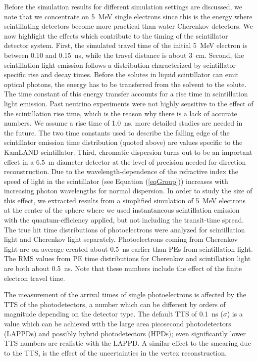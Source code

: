 \documentclass[aps,prc,twocolumn,groupedaddress,showpacs,amsmath,amssymb,floatfix,superscriptaddress]{revtex4}
\begin{document}
Before the simulation results for different simulation settings are
discussed, we note that  we concentrate on 5~MeV single electrons since this is the energy where scintillating detectors become more practical than water Cherenkov detectors. 
We now highlight the effects which
contribute to the timing of the scintillator detector system.  First,
the simulated travel time of the initial 5~MeV electron is between
0.10 and 0.15~ns, while the travel distance is about 3~cm. Second, the
scintillation light emission follows a distribution characterized by
scintillator-specific rise and decay times. Before the solutes in
liquid scintillator can emit optical photons, the energy has to be
transferred from the solvent to the solute. The time constant of this
energy transfer accounts for a rise time in scintillation light
emission. Past neutrino experiments were not highly sensitive to the
effect of the scintillation rise time, which is the reason why there
is a lack of accurate numbers. We assume a rise time of 1.0~ns, more
detailed studies are needed in the future. The two time constants used
to describe the falling edge of the scintillator emission time
distribution (quoted above) are values specific to the KamLAND
scintillator. Third, chromatic dispersion turns out to be an important
effect in a 6.5~m diameter detector at the level of precision needed
for direction reconstruction. Due to the wavelength-dependence of the
refractive index the speed of light in the scintillator (see Equation
(\ref{eqGroup})) increases with increasing photon wavelengths for
normal dispersion. In order to study the size of this effect, we
extracted results from a simplified simulation of 5~MeV electrons at
the center of the sphere where we used instantaneous scintillation
emission with the quantum-efficiency applied, but not including
the transit-time spread. The true hit time distributions of
photoelectrons were analyzed for scintillation light and Cherenkov
light separately. Photoelectrons coming from Cherenkov light are on
average created about 0.5~ns earlier than PEs from scintillation
light. The RMS values from PE time distributions for Cherenkov and
scintillation light are both about 0.5~ns. Note that these numbers
include the effect of the finite electron travel time.

The measurement of the arrival times of single photoelectrons is
affected by the TTS of the photodetectors, a number which can be
different by orders of magnitude depending on the detector type. The
default TTS of 0.1~ns ($\sigma$) is a value which can be achieved with
the large area picosecond photodetectors
(LAPPDs)\cite{LAPPDSum,LAPPDTDR} and possibly hybrid photodetectors
(HPDs)\cite{hpdThesis}; even significantly lower TTS numbers are
realistic with the LAPPD. A similar effect to the smearing due to the TTS, is the effect of the uncertainties in the vertex
reconstruction. 
\end{document}
